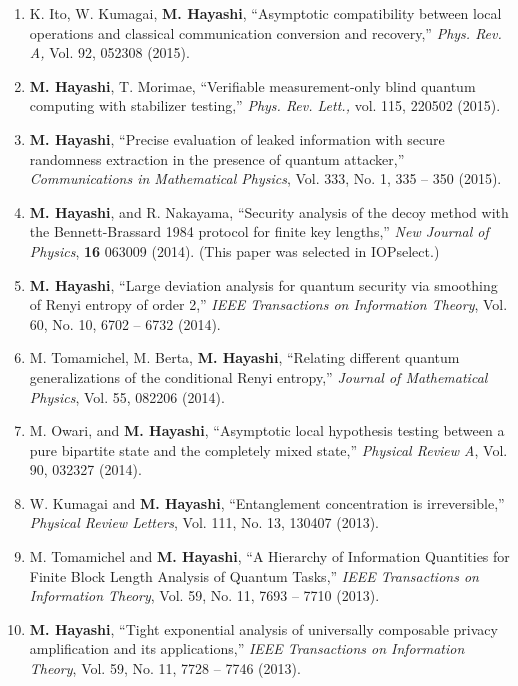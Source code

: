 \documentclass[a4paper,12pt,oneside]{article}
\begin{document}
\begin{enumerate}
\item 
K. Ito, W. Kumagai, \textbf{M. Hayashi}, ``Asymptotic compatibility between local operations and classical communication conversion and recovery,'' 
{\em Phys. Rev. A,} Vol. 92, 052308 (2015). 

\item 
\textbf{M. Hayashi}, T. Morimae, ``Verifiable measurement-only blind quantum computing with stabilizer testing,'' 
{\em Phys. Rev. Lett.,} vol. 115, 220502 (2015). 

\item 
\textbf{M. Hayashi},
``Precise evaluation of leaked information with secure randomness extraction in the
presence of quantum attacker,'' {\em Communications in Mathematical Physics},
Vol. 333, No. 1, 335 -- 350 (2015).

\item 
\textbf{M. Hayashi}, and R. Nakayama, 
``Security analysis of the decoy method with the Bennett-Brassard 1984 protocol for finite key lengths,'' 
{\em New Journal of Physics}, {\bf 16} 063009 (2014).
(This paper was selected in IOPselect.)

\item 
\textbf{M. Hayashi}, 
``Large deviation analysis for quantum security via smoothing of Renyi entropy of order 2,'' 
{\em IEEE Transactions on Information Theory},
 Vol. 60,  No. 10, 6702 -- 6732 (2014).

\item 
M. Tomamichel, M. Berta, \textbf{M. Hayashi},
``Relating different quantum generalizations of the conditional
Renyi entropy,'' 
{\em Journal of Mathematical Physics}, Vol. 55, 082206 (2014).

\item 
M. Owari, and \textbf{M. Hayashi},
``Asymptotic local hypothesis testing between a pure bipartite state and the
completely mixed state,''
{\em Physical Review A}, Vol. 90, 032327 (2014).

\item W. Kumagai and \textbf{M. Hayashi}, 
``Entanglement concentration is irreversible,''
{\em Physical Review Letters}, Vol. 111, No. 13, 130407 (2013).

\item M. Tomamichel and \textbf{M. Hayashi}, 
``A Hierarchy of Information Quantities for Finite Block Length Analysis of Quantum Tasks,''
{\em IEEE Transactions on Information Theory},
 Vol. 59,  No. 11, 7693 -- 7710 (2013).

\item 
\textbf{M. Hayashi}, 
``Tight exponential analysis of universally composable privacy amplification and its applications,''
{\em IEEE Transactions on Information Theory},
 Vol. 59,  No. 11, 7728 -- 7746 (2013).


\end{enumerate}
\end{document}
